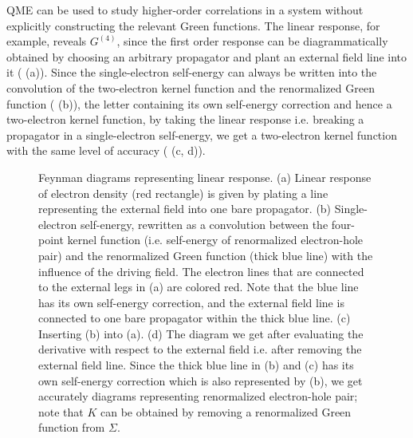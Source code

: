 \documentclass[hyperref, a4paper]{article}
\begin{document}
QME can be used to study higher-order correlations in a system 
without explicitly constructing 
the relevant Green functions.
The linear response, for example, reveals $G^{(4)}$,
since the first order response can be diagrammatically obtained 
by choosing an arbitrary propagator 
and plant an external field line into it ( (a)).
Since the single-electron self-energy can always 
be written into the convolution 
of the two-electron kernel function and 
the renormalized Green function ( (b)),
the letter containing its own self-energy correction 
and hence a two-electron kernel function,
by taking the linear response i.e. breaking a propagator in a single-electron self-energy,
we get a two-electron kernel function 
with the same level of accuracy ( (c, d)). 

\begin{figure}
    \centering
    
    \caption{Feynman diagrams representing linear response. 
    (a) Linear response of electron density (red rectangle) is given by 
    plating a line representing the external field
    into one bare propagator. 
    (b) Single-electron self-energy,
    rewritten as a convolution between 
    the four-point kernel function 
    (i.e. self-energy of renormalized electron-hole pair)
    and the renormalized Green function (thick blue line)
    with the influence of the driving field.
    The electron lines that are connected to the external legs in (a)
    are colored red.
    Note that the blue line has its own self-energy correction,
    and the external field line is connected to one bare propagator 
    within the thick blue line.
    (c) Inserting (b) into (a). 
    (d) The diagram we get after evaluating the derivative with respect to the external field 
    i.e. after removing the external field line.
    Since the thick blue line in (b) and (c) has its own self-energy correction
    which is also represented by (b), 
    we get accurately diagrams representing renormalized electron-hole pair;
    note that $K$ can be obtained by removing a renormalized Green function from $\Sigma$.} 
    \label{fig:linear-response}
\end{figure}
\end{document}
